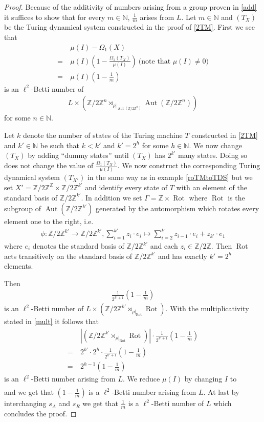 \documentclass[12pt,a4paper]{scrartcl}
\theoremstyle{plain}
\theoremstyle{definition}
\newcommand{\Z}{\mathbb{Z}} %
\newcommand{\N}{\mathbb{N}} %
\newcommand{\2}{\mathbb{Z} / 2 \mathbb{Z}}
\newcommand{\1}{\bar{1}}
\newcommand{\0}{\bar{0}}
\newcommand{\Aut}{\operatorname{Aut}}
\newcommand{\Rot}{\operatorname{Rot}}
\begin{document}
\begin{proof}
	Because of the additivity of numbers arising from a group proven in \ref{add} it suffices to show that for every $m \in \N$, $\frac{1}{m}$ arises from $L$. Let $m \in \N$  and $(T_X)$ be the Turing dynamical system constructed in the proof of \ref{2TM}. First we see that
	\begin{align*}
		 &~ \mu (I) - \Omega_1(X) \\
		=&~ \mu (I) (1 - \frac{\Omega_1(T_X)}{\mu(I)}) ~ \text{(note that $\mu(I) \neq 0)$} \\
		=&~ \mu (I) (1 - \frac{1}{m})
	\end{align*}
	is an $\ell^2$-Betti number of 
	\begin{align*}
		L \times (\2^n \rtimes_{\rho|_{\Aut(\2^n)}} \Aut(\2^n))
	\end{align*}
	for some $n \in \N$.
	
	Let $k$ denote the number of states of the Turing machine $T$ constructed in \ref{2TM} and $k' \in \N$ be such that $k < k'$ and $k' = 2^{h}$ for some $h \in \N$. We now change $(T_X)$ by adding ``dummy states'' until $(T_X)$ has $2^{k'}$ many states. Doing so does not change the value of $\frac{\Omega_1(T_X)}{\mu(I)}$. We now construct the corresponding Turing dynamical system $(T_{X'})$ in the same way as in example \ref{roTMtoTDS} but we set $X' = \2^\Z \times \2^{k'}$ and identify every state of $T$ with an element of the standard basis of $\2^{k'}$. In addition we set $\Gamma = \Z \times \Rot$ where $\Rot$ is the subgroup of $\Aut(\2^{k'})$ generated by the automorphism which rotates every element one to the right, i.e.
	\begin{align*}
		\phi \colon\2^{k'} \to \2^{k'}, \sum_{i =1}^{k'}z_i \cdot e_i \mapsto \sum_{i =2}^{k'}z_{i - 1} \cdot e_i + z_{k'} \cdot e_1
	\end{align*}
	where $e_i$ denotes the standard basis of $\2^{k'}$ and each $z_i \in \2$. Then $\Rot$ acts transitively on the standard basis of $\2^{k'}$ and has exactly $k' = 2^{h}$ elements.
	
	Then 
	\begin{align*}
		\frac{1}{2^{k' + 1}} (1 - \frac{1}{m})
	\end{align*}
	is an $\ell^2$-Betti number of $L \times (\2^{k'} \rtimes_{\rho|_{\Rot}} \Rot)$. With the multiplicativity stated in \ref{mult} it follows that 
	\begin{align*}
		 &~ |(\2^{k'} \rtimes_{\rho|_{\Rot}} \Rot)| \cdot \frac{1}{2^{k' + 1}} (1 - \frac{1}{m}) \\
		=&~ 2^{k'} \cdot 2^h \cdot \frac{1}{2^{k' + 1}} (1 - \frac{1}{m}) \\
		=&~ 2^{h -1} (1 - \frac{1}{m})
	\end{align*}
	is an $\ell^2$-Betti number arising from $L$. We reduce $\mu(I)$ by changing $I$ to
	\begin{align*}
		[\1^{h-1} \underline{\1}][s_I]
	\end{align*}
	and we get that $(1 - \frac{1}{m})$ is a $\ell^2$-Betti number arising from $L$. At last by interchanging $s_A$ and $s_R$ we get that $\frac{1}{m}$ is a $\ell^2$-Betti number of $L$ which concludes the proof.
\end{proof}
\end{document}
